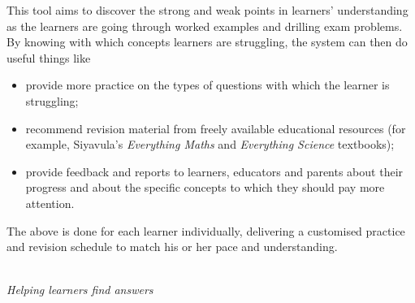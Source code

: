 {This tool aims to discover the strong and weak points in learners' understanding as the learners are going through worked examples and drilling exam problems. By knowing with which concepts learners are struggling, the system can then do useful things like
\begin{itemize}[noitemsep]
\item provide more practice on the types of questions with which the learner is struggling;
\item recommend revision material from freely available educational resources (for example,  Siyavula's \textit{Everything Maths} and \textit{Everything Science} textbooks);
\item provide feedback and reports to learners, educators and parents about their progress and about the specific concepts to which they should pay more attention.
\end{itemize}
 The above is done for each learner individually, delivering a customised practice and revision schedule to match his or her pace and understanding.






\vspace*{1cm}
}
\\
{\normalfont\sffamily\fontsize{22}\normalfont\itshape Helping learners find answers} \par

